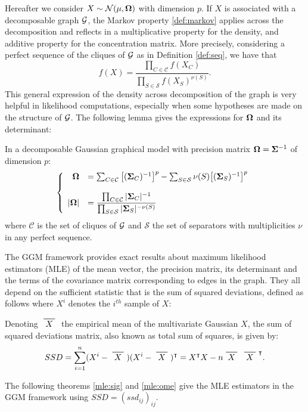 Hereafter we consider  $X\sim\mathcal{N} (\mu, {\boldsymbol{\Omega}})$ with dimension $p$. If $X$ is associated with a decomposable graph $\mathcal{G}$, the Markov property \ref{def:markov} applies across the decomposition and reflects in a multiplicative property for the density, and additive property for the concentration matrix. More precisely, considering a perfect sequence of the cliques of $\mathcal{G}$ as in Definition \ref{def:seq}, we have that
 $$f(X)=\dfrac{\prod_{C\in \mathcal{C}} f(X_C)}{\prod_{S\in \mathcal{S}} f(X_S)^{\nu(S)}}.$$
This general expression of the density across decomposition of the graph is very helpful in likelihood computations, especially when some hypotheses are made on the structure of $\mathcal{G}$. The following lemma gives the expressions for ${\boldsymbol{\Omega}}$ and its determinant:
 \begin{lemma} In a decomposable Gaussian graphical model with precision matrix ${\boldsymbol{\Omega}} = {\boldsymbol{\Sigma}}^{-1}$ of dimension $p$:
 \begin{equation*}
 \left\{
 \begin{array}{rl}
 {\boldsymbol{\Omega}} &= \sum_{C\in \mathcal{C}} \big[({\boldsymbol{\Sigma}}_C)^{-1}\big]^p - \sum_{S\in \mathcal{S}} \nu(S)  \big[({\boldsymbol{\Sigma}}_S)^{-1}\big]^p \\\\
 |{\boldsymbol{\Omega}}| &=\dfrac{\prod_{C\in \mathcal{C}} |{\boldsymbol{\Sigma}}_C|^{-1}}{\prod_{S\in \mathcal{S}} |{\boldsymbol{\Sigma}}_S|^{-\nu(S)}}
 \end{array} \right.
\end{equation*}  
where $\mathcal{C}$ is the set of cliques of $\mathcal{G}$ and $\mathcal{S}$ the set of separators with multiplicities $\nu$ in any perfect sequence. 
\end{lemma}

The GGM framework provides exact results about maximum likelihood estimators (MLE) of the mean vector, the precision matrix, its determinant and the terms of the covariance matrix corresponding to edges in the graph. They all depend on the sufficient statistic that is the sum of squared deviations, defined as follows where $X^i$ denotes the $i^{th}$ sample of $X$:
\begin{definition}
Denoting $\xbar{X}$ the empirical mean of the multivariate Gaussian $X$, the sum of squared deviations matrix, also known as total sum of squares,  is given by:
$$SSD = \sum_{i=1}^n (X^i - \xbar{X})(X^i - \xbar{X})^\intercal = X^\intercal X - n  \xbar{X} \,\xbar{X}^\intercal.$$
\end{definition}
The following theorems \ref{mle:sig} and \ref{mle:ome} give the MLE estimators in the GGM framework using $SSD=(ssd_{ij})_{ij}$.
 
